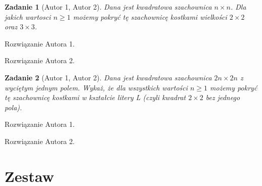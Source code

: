 \documentclass{mwart}
\newtheorem{zad}{Zadanie}[section]
\begin{document}
\begin{zad}[Autor 1, Autor 2]
    Dana jest kwadratowa szachownica $n \times n$. Dla jakich wartosci $n\geq 1$
    możemy pokryć tę szachownicę kostkami wielkości $2 \times 2$ oraz $3 \times 3$.
\end{zad}
\begin{mdframed}
    Rozwiązanie Autora 1.
\end{mdframed}
\begin{mdframed}
    Rozwiązanie Autora 2.
\end{mdframed}


\begin{zad}[Autor 1, Autor 2]
    Dana jest kwadratowa szachownica $2n \times 2n$ z wyciętym jednym polem.
    Wykaż, że dla wszystkich wartości $n \geq 1$ możemy pokryć tę szachownicę kostkami w
    kształcie litery L (czyli kwadrat $2 \times 2$ bez jednego pola).
\end{zad}
\begin{mdframed}
    Rozwiązanie Autora 1.
\end{mdframed}
\begin{mdframed}
    Rozwiązanie Autora 2.
\end{mdframed}






















\newpage
\section{Zestaw}          %
\end{document}
